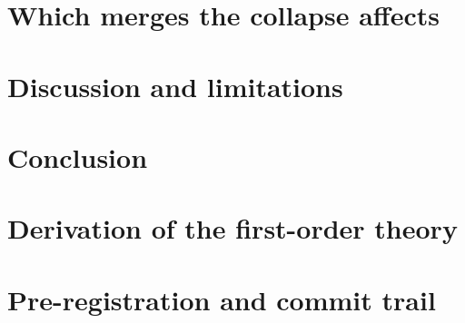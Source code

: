 \documentclass[preprint,12pt,number,sort&compress]{elsarticle}
\begin{document}
\section{Which merges the collapse affects}\label{sec:merging}


\section{Discussion and limitations}\label{sec:discussion}


\section{Conclusion}\label{sec:conclusion}







\appendix
\section{Derivation of the first-order theory}\label{app:theory}


\section{Pre-registration and commit trail}\label{app:prereg}

\end{document}
